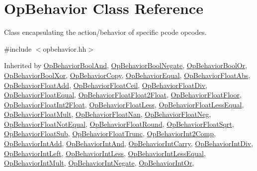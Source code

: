\hypertarget{class_op_behavior}{}\section{Op\+Behavior Class Reference}
\label{class_op_behavior}


Class encapsulating the action/behavior of specific pcode opcodes.  




{\ttfamily \#include $<$opbehavior.\+hh$>$}



Inherited by \mbox{\hyperlink{class_op_behavior_bool_and}{Op\+Behavior\+Bool\+And}}, \mbox{\hyperlink{class_op_behavior_bool_negate}{Op\+Behavior\+Bool\+Negate}}, \mbox{\hyperlink{class_op_behavior_bool_or}{Op\+Behavior\+Bool\+Or}}, \mbox{\hyperlink{class_op_behavior_bool_xor}{Op\+Behavior\+Bool\+Xor}}, \mbox{\hyperlink{class_op_behavior_copy}{Op\+Behavior\+Copy}}, \mbox{\hyperlink{class_op_behavior_equal}{Op\+Behavior\+Equal}}, \mbox{\hyperlink{class_op_behavior_float_abs}{Op\+Behavior\+Float\+Abs}}, \mbox{\hyperlink{class_op_behavior_float_add}{Op\+Behavior\+Float\+Add}}, \mbox{\hyperlink{class_op_behavior_float_ceil}{Op\+Behavior\+Float\+Ceil}}, \mbox{\hyperlink{class_op_behavior_float_div}{Op\+Behavior\+Float\+Div}}, \mbox{\hyperlink{class_op_behavior_float_equal}{Op\+Behavior\+Float\+Equal}}, \mbox{\hyperlink{class_op_behavior_float_float2_float}{Op\+Behavior\+Float\+Float2\+Float}}, \mbox{\hyperlink{class_op_behavior_float_floor}{Op\+Behavior\+Float\+Floor}}, \mbox{\hyperlink{class_op_behavior_float_int2_float}{Op\+Behavior\+Float\+Int2\+Float}}, \mbox{\hyperlink{class_op_behavior_float_less}{Op\+Behavior\+Float\+Less}}, \mbox{\hyperlink{class_op_behavior_float_less_equal}{Op\+Behavior\+Float\+Less\+Equal}}, \mbox{\hyperlink{class_op_behavior_float_mult}{Op\+Behavior\+Float\+Mult}}, \mbox{\hyperlink{class_op_behavior_float_nan}{Op\+Behavior\+Float\+Nan}}, \mbox{\hyperlink{class_op_behavior_float_neg}{Op\+Behavior\+Float\+Neg}}, \mbox{\hyperlink{class_op_behavior_float_not_equal}{Op\+Behavior\+Float\+Not\+Equal}}, \mbox{\hyperlink{class_op_behavior_float_round}{Op\+Behavior\+Float\+Round}}, \mbox{\hyperlink{class_op_behavior_float_sqrt}{Op\+Behavior\+Float\+Sqrt}}, \mbox{\hyperlink{class_op_behavior_float_sub}{Op\+Behavior\+Float\+Sub}}, \mbox{\hyperlink{class_op_behavior_float_trunc}{Op\+Behavior\+Float\+Trunc}}, \mbox{\hyperlink{class_op_behavior_int2_comp}{Op\+Behavior\+Int2\+Comp}}, \mbox{\hyperlink{class_op_behavior_int_add}{Op\+Behavior\+Int\+Add}}, \mbox{\hyperlink{class_op_behavior_int_and}{Op\+Behavior\+Int\+And}}, \mbox{\hyperlink{class_op_behavior_int_carry}{Op\+Behavior\+Int\+Carry}}, \mbox{\hyperlink{class_op_behavior_int_div}{Op\+Behavior\+Int\+Div}}, \mbox{\hyperlink{class_op_behavior_int_left}{Op\+Behavior\+Int\+Left}}, \mbox{\hyperlink{class_op_behavior_int_less}{Op\+Behavior\+Int\+Less}}, \mbox{\hyperlink{class_op_behavior_int_less_equal}{Op\+Behavior\+Int\+Less\+Equal}}, \mbox{\hyperlink{class_op_behavior_int_mult}{Op\+Behavior\+Int\+Mult}}, \mbox{\hyperlink{class_op_behavior_int_negate}{Op\+Behavior\+Int\+Negate}}, \mbox{\hyperlink{class_op_behavior_int_or}{Op\+Behavior\+Int\+Or}}, 